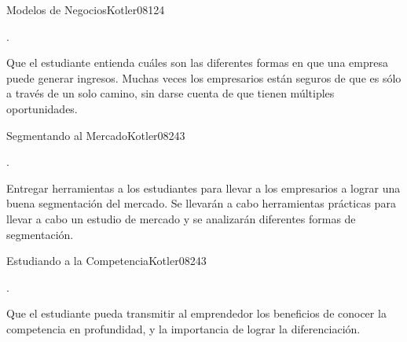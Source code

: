\begin{syllabus}
\begin{outcomes}
    \item {}
    \item {}
\end{outcomes}

\begin{competences}
    \item {}
\end{competences}

\begin{unit}{Modelos de Negocios}{}{Kotler08}{12}{4}
   \begin{topics}
      \item .
   \end{topics}

   \begin{learningoutcomes}
      \item Que el estudiante entienda cuáles son las diferentes formas en que una empresa puede generar ingresos. Muchas veces los empresarios están seguros de que es sólo a través de un solo camino, sin darse cuenta de que tienen múltiples oportunidades.
   \end{learningoutcomes}

\end{unit}

\begin{unit}{Segmentando al Mercado}{}{Kotler08}{24}{3}
   \begin{topics}
      \item .
   \end{topics}

   \begin{learningoutcomes}
      \item Entregar herramientas a los estudiantes para llevar a los empresarios a lograr una buena segmentación del mercado. Se llevarán a cabo herramientas prácticas para llevar a cabo un estudio de mercado y se analizarán diferentes formas de segmentación.
   \end{learningoutcomes}

\end{unit}

\begin{unit}{Estudiando a la Competencia}{}{Kotler08}{24}{3}
   \begin{topics}
      \item .
   \end{topics}

   \begin{learningoutcomes}
      \item Que el estudiante pueda transmitir al emprendedor los beneficios de conocer la competencia en profundidad, y la importancia de lograr la diferenciación.
   \end{learningoutcomes}


\end{unit}
\end{syllabus}

